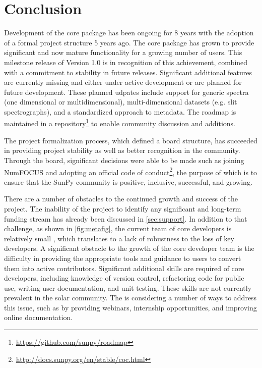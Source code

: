 \section{Conclusion}
\label{sec:conclusion}

Development of the \sunpypkg core package has been ongoing for 8 years with the adoption of a formal project structure 5 years ago.
The core package has grown to provide significant and now mature functionality for a growing number of users.
This milestone release of Version 1.0 is in recognition of this achievement, combined with a commitment to stability in future releases.
Significant additional features are currently missing and either under active development or are planned for future development.
These planned udpates include support for generic spectra (one dimensional or multidimensional), multi-dimensional datasets (e.g. slit spectrographs), and a standardized approach to metadata. The roadmap is maintained in a repository\footnote{\url{https://github.com/sunpy/roadmap}} to enable community discussion and additions.

The project formalization process, which defined a board structure, has succeeded in providing project stability as well as better recognition in the community.
Through the board, significant decisions were able to be made such as joining NumFOCUS and adopting an official code of conduct\footnote{\url{http://docs.sunpy.org/en/stable/coc.html}}, the purpose of which is to ensure that the SunPy community is positive, inclusive, successful, and growing.

There are a number of obstacles to the continued growth and success of the project. The inability of the project to identify any significant and long-term funding stream has already been discussed in \autoref{sec:support}.
In addition to that challenge, as shown in \autoref{fig:metafig}, the current team of core developers is relatively small , which translates to a lack of robustness to the loss of key developers.
A significant obstacle to the growth of the core developer team is the difficulty in providing the appropriate tools and guidance to users to convert them into active contributors.
Significant additional skills are required of core developers, including knowledge of version control, refactoring code for public use, writing user documentation, and unit testing.
These skills are not currently prevalent in the solar community.
The \sunpyproj is considering a number of ways to address this issue, such as by providing webinars, internship opportunities, and improving online documentation.

